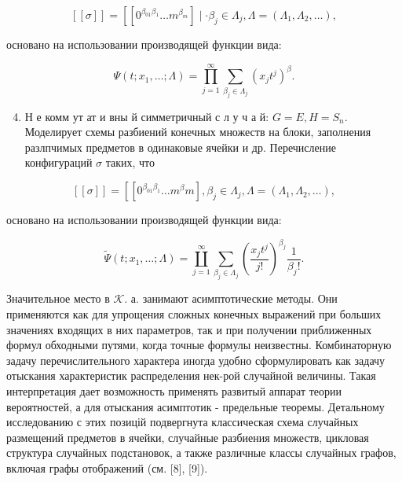 \documentclass[10pt]{article}
\begin{document}
\[

[[\sigma]]=\left[\left[0^{\beta_{01} \beta_{1}} \ldots m^{\beta_{m}}\right] \mid \cdot \beta_{j} \in \Lambda_{j}, \Lambda=\left(\Lambda_{1}, \Lambda_{2}, \ldots\right),\right.

\]



основано на использовании производящей функции вида:



\[

\Psi\left(t ; x_{1}, \ldots ; \Lambda\right)=\prod_{j=1}^{\infty} \sum_{\beta_{j} \in \Lambda_{j}}\left(x_{j} t^{j}\right)^{\beta} .

\]



\begin{enumerate}

  \setcounter{enumi}{3}

  \item Н е комм ут ат и вны й симметричный с л у ч а й: $G=E, H=S_{n}$. Моделирует схемы разбиений конечных множеств на блоки, заполнения разлпчимых предметов в одинаковые ячейки и др. Перечисление конфигураций $\sigma$ таких, что

\end{enumerate}



\[

[[\sigma]]=\left[\left[0^{\beta_{01} \beta_{1}} \ldots m^{\beta} m\right], \beta_{j} \in \Lambda_{j}, \Lambda=\left(\Lambda_{1}, \Lambda_{2}, \ldots\right),\right.

\]



основано на использовании производящей функции вида:



\[

\tilde{\Psi}\left(t ; x_{1}, \ldots ; \Lambda\right)=\coprod_{j=1}^{\infty} \sum_{\beta_{j} \in \Lambda_{j}}\left(\frac{x_{j} t^{j}}{j !}\right)^{\beta_{j}} \frac{1}{\beta_{j} !} .

\]



Значительное место в $\mathcal{K}$. а. занимают асимптотические методы. Они применяются как для упрощения сложных конечных выражений при больших значениях входящих в них параметров, так и при получении приближенных формул обходными путями, когда точные формулы неизвестны. Комбинаторную задачу перечислительного характера иногда удобно сформулировать как задачу отыскания характеристик распределения нек-рой случайной величины. Такая интерпретация дает возможность применять развитый аппарат теории вероятностей, а для отыскания асимптотик - предельные теоремы. Детальному исследованию с этих позицій подвергнута классическая схема случайных размещений предметов в ячейки, случайные разбиения множеств, цикловая структура случайных подстановок, а также различные классы случайных графов, включая графы отображений (см. [8], [9]).
\end{document}
